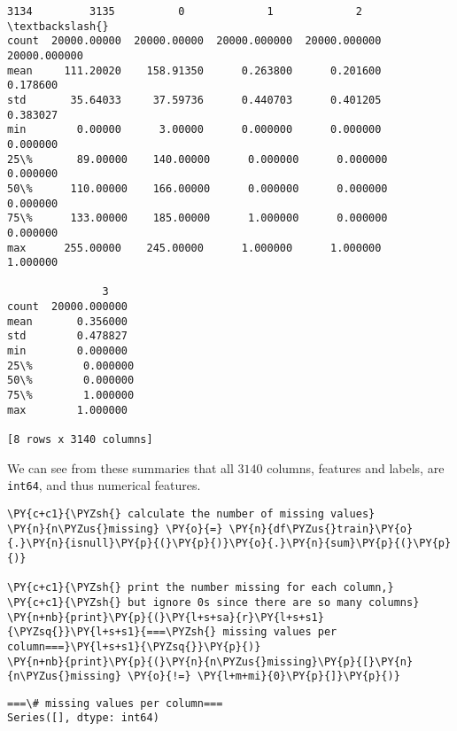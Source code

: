 \begin{tcolorbox}[breakable, size=fbox, boxrule=.5pt, pad at break*=1mm, opacityfill=0]
\begin{Verbatim}[commandchars=\\\{\}]
              3134         3135          0             1             2     \textbackslash{}
count  20000.00000  20000.00000  20000.000000  20000.000000  20000.000000
mean     111.20020    158.91350      0.263800      0.201600      0.178600
std       35.64033     37.59736      0.440703      0.401205      0.383027
min        0.00000      3.00000      0.000000      0.000000      0.000000
25\%       89.00000    140.00000      0.000000      0.000000      0.000000
50\%      110.00000    166.00000      0.000000      0.000000      0.000000
75\%      133.00000    185.00000      1.000000      0.000000      0.000000
max      255.00000    245.00000      1.000000      1.000000      1.000000

               3
count  20000.000000
mean       0.356000
std        0.478827
min        0.000000
25\%        0.000000
50\%        0.000000
75\%        1.000000
max        1.000000

[8 rows x 3140 columns]
\end{Verbatim}
\end{tcolorbox}
        
    We can see from these summaries that all \(3140\) columns, features and
labels, are \texttt{int64}, and thus numerical features.

    \begin{tcolorbox}[breakable, size=fbox, boxrule=1pt, pad at break*=1mm,colback=cellbackground, colframe=cellborder]
\begin{Verbatim}[commandchars=\\\{\}]
\PY{c+c1}{\PYZsh{} calculate the number of missing values}
\PY{n}{n\PYZus{}missing} \PY{o}{=} \PY{n}{df\PYZus{}train}\PY{o}{.}\PY{n}{isnull}\PY{p}{(}\PY{p}{)}\PY{o}{.}\PY{n}{sum}\PY{p}{(}\PY{p}{)}

\PY{c+c1}{\PYZsh{} print the number missing for each column,}
\PY{c+c1}{\PYZsh{} but ignore 0s since there are so many columns}
\PY{n+nb}{print}\PY{p}{(}\PY{l+s+sa}{r}\PY{l+s+s1}{\PYZsq{}}\PY{l+s+s1}{===\PYZsh{} missing values per column===}\PY{l+s+s1}{\PYZsq{}}\PY{p}{)}
\PY{n+nb}{print}\PY{p}{(}\PY{n}{n\PYZus{}missing}\PY{p}{[}\PY{n}{n\PYZus{}missing} \PY{o}{!=} \PY{l+m+mi}{0}\PY{p}{]}\PY{p}{)}
\end{Verbatim}
\end{tcolorbox}

    \begin{Verbatim}[commandchars=\\\{\}]
===\# missing values per column===
Series([], dtype: int64)
    \end{Verbatim}

